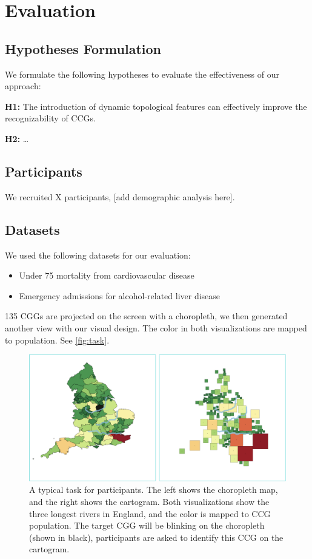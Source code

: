 \color{blue}

\section{Evaluation}

\subsection{Hypotheses Formulation}

We formulate the following hypotheses to evaluate the effectiveness of our approach:

\textbf{H1:} The introduction of dynamic topological features can effectively improve the recognizability of CCGs.

\textbf{H2:} \dots

\subsection{Participants}

We recruited X participants, [add demographic analysis here].

\subsection{Datasets}

We used the following datasets for our evaluation:

\begin{itemize}
    \item Under 75 mortality from cardiovascular disease
    \item Emergency admissions for alcohol-related liver disease
\end{itemize}

135 CGGs are projected on the screen with a choropleth, we then generated another view with our visual design. The color in both visualizations are mapped to population. See \autoref{fig:task}.

{
    \begin{figure}[htb!]
        \centering
        \includegraphics[width=\columnwidth,keepaspectratio]{figure/evaluation/task.png}
        \caption{A typical task for participants. The left shows the choropleth map, and the right shows the cartogram. Both visualizations show the three longest rivers in England, and the color is mapped to CCG population. The target CGG will be blinking on the choropleth (shown in black), participants are asked to identify this CCG on the cartogram.}
        \label{fig:task}
    \end{figure}
}

